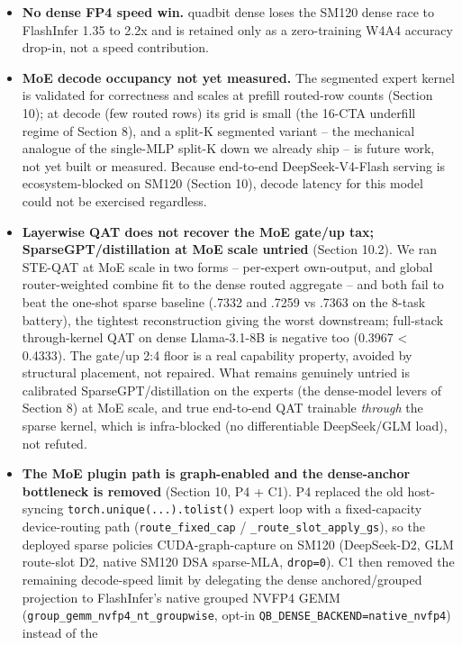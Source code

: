 \documentclass[
]{article}
\begin{document}
\begin{itemize}
  recovery, not serving plumbing.
\item
  \textbf{No dense FP4 speed win.} quadbit dense loses the SM120 dense
  race to FlashInfer 1.35 to 2.2x and is retained only as a
  zero-training W4A4 accuracy drop-in, not a speed contribution.
\item
  \textbf{MoE decode occupancy not yet measured.} The segmented expert
  kernel is validated for correctness and scales at prefill routed-row
  counts (Section 10); at decode (few routed rows) its grid is small
  (the 16-CTA underfill regime of Section 8), and a split-K segmented
  variant -- the mechanical analogue of the single-MLP split-K down we
  already ship -- is future work, not yet built or measured. Because
  end-to-end DeepSeek-V4-Flash serving is ecosystem-blocked on SM120
  (Section 10), decode latency for this model could not be exercised
  regardless.
\item
  \textbf{Layerwise QAT does not recover the MoE gate/up tax;
  SparseGPT/distillation at MoE scale untried} (Section 10.2). We ran
  STE-QAT at MoE scale in two forms -- per-expert own-output, and global
  router-weighted combine fit to the dense routed aggregate -- and both
  fail to beat the one-shot sparse baseline (.7332 and .7259 vs .7363 on
  the 8-task battery), the tightest reconstruction giving the worst
  downstream; full-stack through-kernel QAT on dense Llama-3.1-8B is
  negative too (0.3967 \textless{} 0.4333). The gate/up 2:4 floor is a
  real capability property, avoided by structural placement, not
  repaired. What remains genuinely untried is calibrated
  SparseGPT/distillation on the experts (the dense-model levers of
  Section 8) at MoE scale, and true end-to-end QAT trainable
  \emph{through} the sparse kernel, which is infra-blocked (no
  differentiable DeepSeek/GLM load), not refuted.
\item
  \textbf{The MoE plugin path is graph-enabled and the dense-anchor
  bottleneck is removed} (Section 10, P4 + C1). P4 replaced the old
  host-syncing \texttt{torch.unique(...).tolist()} expert loop with a
  fixed-capacity device-routing path (\texttt{route\_fixed\_cap} /
  \texttt{\_route\_slot\_apply\_gs}), so the deployed sparse policies
  CUDA-graph-capture on SM120 (DeepSeek-D2, GLM route-slot D2, native
  SM120 DSA sparse-MLA, \texttt{drop=0}). C1 then removed the remaining
  decode-speed limit by delegating the dense anchored/grouped projection
  to FlashInfer's native grouped NVFP4 GEMM
  (\texttt{group\_gemm\_nvfp4\_nt\_groupwise}, opt-in
  \texttt{QB\_DENSE\_BACKEND=native\_nvfp4}) instead of the

\end{itemize}
\end{document}
